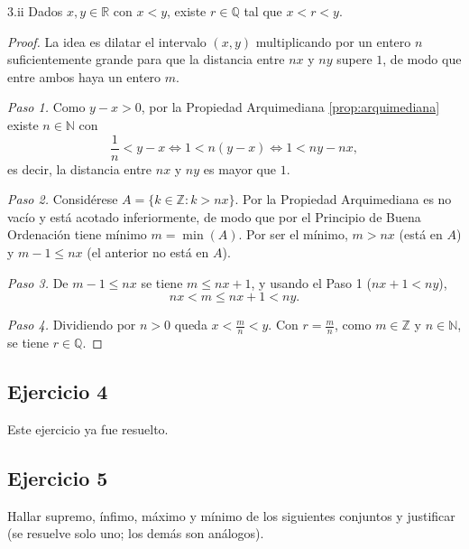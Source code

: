 \documentclass[11pt, a4paper]{article}
\begin{document}
\begin{proposicion}{3.ii}{}
Dados $x, y \in \mathbb{R}$ con $x < y$, existe $r \in \mathbb{Q}$ tal que $x < r < y$.
\end{proposicion}

\begin{proof}
La idea es dilatar el intervalo $(x, y)$ multiplicando por un entero $n$ suficientemente grande para
que la distancia entre $nx$ y $ny$ supere $1$, de modo que entre ambos haya un entero $m$.

\textit{Paso 1.} Como $y - x > 0$, por la Propiedad Arquimediana \ref{prop:arquimediana} existe
$n \in \mathbb{N}$ con
$$ \frac{1}{n} < y - x \iff 1 < n(y - x) \iff 1 < ny - nx, $$
es decir, la distancia entre $nx$ y $ny$ es mayor que $1$.

\textit{Paso 2.} Considérese $A = \{ k \in \mathbb{Z} : k > nx \}$. Por la Propiedad Arquimediana es
no vacío y está acotado inferiormente, de modo que por el Principio de Buena Ordenación tiene mínimo
$m = \min(A)$. Por ser el mínimo, $m > nx$ (está en $A$) y $m - 1 \le nx$ (el anterior no está en
$A$).

\textit{Paso 3.} De $m - 1 \le nx$ se tiene $m \le nx + 1$, y usando el Paso 1 ($nx + 1 < ny$),
$$ nx < m \le nx + 1 < ny. $$

\textit{Paso 4.} Dividiendo por $n > 0$ queda $x < \frac{m}{n} < y$. Con $r = \frac{m}{n}$, como
$m \in \mathbb{Z}$ y $n \in \mathbb{N}$, se tiene $r \in \mathbb{Q}$.
\end{proof}

\subsection*{Ejercicio 4}

Este ejercicio ya fue resuelto.

\subsection*{Ejercicio 5}

Hallar supremo, ínfimo, máximo y mínimo de los siguientes conjuntos y justificar (se resuelve solo
uno; los demás son análogos).
\end{document}
